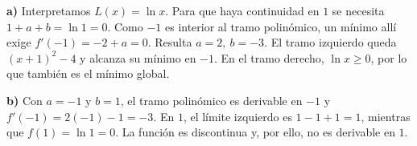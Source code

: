 \textbf{a)} Interpretamos $L(x)=\ln x$. Para que haya continuidad en $1$ se necesita $1+a+b=\ln1=0$. Como $-1$ es interior al tramo polinómico, un mínimo allí exige $f'(-1)=-2+a=0$. Resulta $\boxed{a=2,\ b=-3}$. El tramo izquierdo queda $(x+1)^2-4$ y alcanza su mínimo en $-1$. En el tramo derecho, $\ln x\ge0$, por lo que también es el mínimo global.

\textbf{b)} Con $a=-1$ y $b=1$, el tramo polinómico es derivable en $-1$ y $f'(-1)=2(-1)-1=\boxed{-3}$. En $1$, el límite izquierdo es $1-1+1=1$, mientras que $f(1)=\ln1=0$. La función es discontinua y, por ello, no es derivable en $1$.
